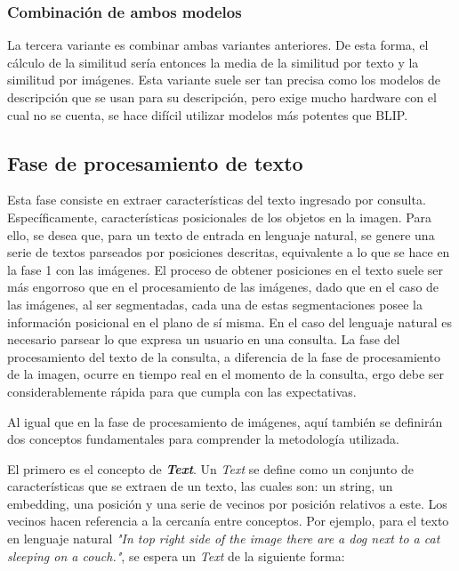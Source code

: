 \subsubsection*{Combinaci\'on de ambos modelos}
La tercera variante es combinar ambas variantes anteriores. De esta forma, el cálculo de la similitud sería entonces la media de la similitud por texto y la similitud por imágenes. Esta variante suele ser tan precisa como los modelos de descripción que se usan para su descripción, pero exige mucho hardware con el cual no se cuenta, se hace dif\'icil utilizar modelos más potentes que BLIP.

\subsection*{Fase de procesamiento de texto}

Esta fase consiste en extraer características del texto ingresado por consulta. Específicamente, características posicionales de los objetos en la imagen. Para ello, se desea que, para un texto de entrada en lenguaje natural, se genere una serie de textos parseados por posiciones descritas, equivalente a lo que se hace en la fase 1 con las imágenes. El proceso de obtener posiciones en el texto suele ser más engorroso que en el procesamiento de las imágenes, dado que en el caso de las imágenes, al ser segmentadas, cada una de estas segmentaciones posee la información posicional en el plano de sí misma. En el caso del lenguaje natural es necesario parsear lo que expresa un usuario en una consulta. La fase del procesamiento del texto de la consulta, a diferencia de la fase de procesamiento de la imagen, ocurre en tiempo real en el momento de la consulta, ergo debe ser considerablemente rápida para que cumpla con las expectativas.

Al igual que en la fase de procesamiento de imágenes, aquí también se definirán dos conceptos fundamentales para comprender la metodología utilizada.

El primero es el concepto de \textit{\textbf{Text}}. Un \textit{Text} se define como un conjunto de características que se extraen de un texto, las cuales son: un string, un embedding, una posición y una serie de vecinos por posición relativos a este. Los vecinos hacen referencia a la cercanía entre conceptos. Por ejemplo, para el texto en lenguaje natural \textit{"In top right side of the image there are a dog next to a cat sleeping on a couch."}, se espera un \textit{Text} de la siguiente forma:

